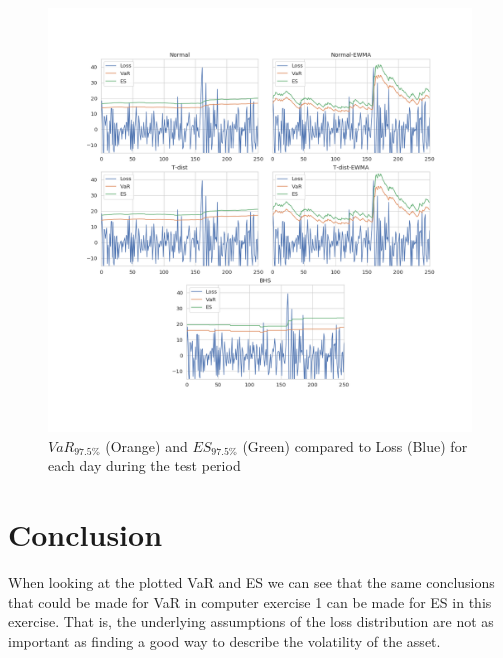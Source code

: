 \documentclass[a4paper]{article}
\begin{document}
\begin{figure}[H]
    \includegraphics[width=\textwidth]{plot.png}
    \caption{$VaR_{97.5\%}$ (Orange) and $ES_{97.5\%}$ (Green) compared to Loss (Blue) for each day during the test period}
    \label{var2}
\end{figure}

\section{Conclusion}
When looking at the plotted VaR and ES we can see that the same conclusions that could be made for VaR in computer exercise 1 can be made for ES in this exercise. That is, the underlying assumptions of the loss distribution are not as important as finding a good way to describe the volatility of the asset. 
\end{document}
